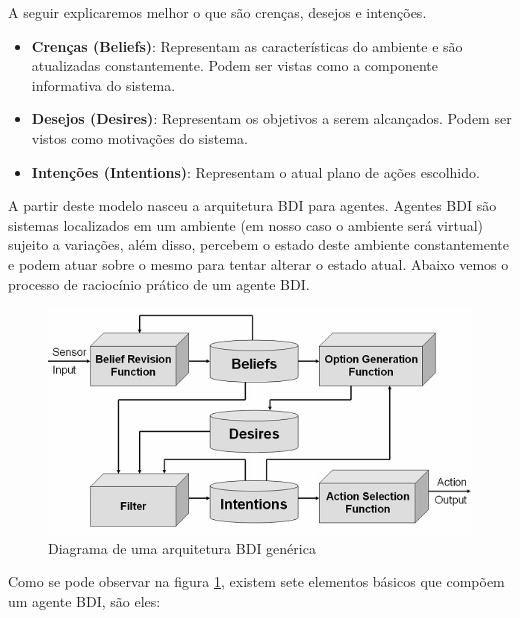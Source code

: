 A seguir explicaremos melhor o que são crenças, desejos e intenções.
\begin{itemize}
\item \textbf{Crenças (Beliefs)}: Representam as características do ambiente e são atualizadas constantemente. Podem ser vistas como a componente informativa do sistema.
\item \textbf{Desejos (Desires)}: Representam os objetivos a serem alcançados. Podem ser vistos como motivações do sistema.
\item \textbf{Intenções (Intentions)}: Representam o atual plano de ações escolhido. 
\end{itemize}

A partir deste modelo nasceu a arquitetura BDI para agentes. Agentes BDI são sistemas localizados em um ambiente (em nosso caso o ambiente será virtual) sujeito a variações, além disso, percebem o estado deste ambiente constantemente e podem atuar sobre o mesmo para tentar alterar o estado atual.
Abaixo vemos o processo de raciocínio prático de um agente BDI.
 
\begin{figure}
\centering
\includegraphics{figuras/visao_BDI.jpg}
\caption{Diagrama de uma arquitetura BDI genérica~\cite{wooldrige_agentes}}
\label{arquitetura BDI}
\end{figure}

Como se pode observar na figura \ref{arquitetura BDI}, existem sete elementos básicos que compõem um agente BDI, são eles:

